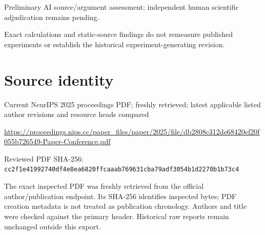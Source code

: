 \documentclass[11pt]{article}
\begin{document}
Preliminary AI source/argument assessment; independent human scientific adjudication remains pending.\par

Exact calculations and static-source findings do not remeasure published experiments or establish the historical experiment-generating revision.\par

\section*{Source identity}

Current NeurIPS 2025 proceedings PDF; freshly retrieved; latest applicable listed author revisions and resource heads compared

\url{https://proceedings.nips.cc/paper_files/paper/2025/file/db2808c312de68420ef20f055b726549-Paper-Conference.pdf}

Reviewed PDF SHA-256: \nolinkurl{cc2f1e41992740df4e8ea6820ffcaaab769631cba79adf3054b1d2270b1b73c4}

The exact inspected PDF was freshly retrieved from the official author/publication endpoint. Its SHA-256 identifies inspected bytes; PDF creation metadata is not treated as publication chronology. Authors and title were checked against the primary header. Historical raw reports remain unchanged outside this export.
\end{document}
